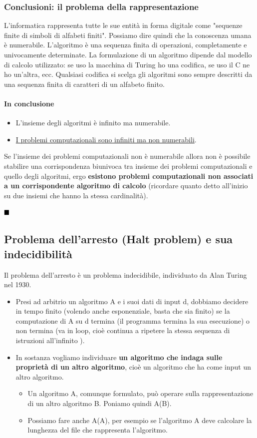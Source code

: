 \subsubsection{Conclusioni: il problema della rappresentazione}
L'informatica rappresenta tutte le sue entità in forma digitale come "sequenze finite di simboli di alfabeti finiti". Possiamo dire quindi che la conoscenza umana è numerabile. L'algoritmo è una sequenza finita di operazioni, completamente e univocamente determinate. La formulazione di un algoritmo dipende dal modello di calcolo utilizzato: se uso la macchina di Turing ho una codifica, se uso il C ne ho un'altra, ecc. Qualsiasi codifica si scelga gli algoritmi sono sempre descritti da una sequenza finita di caratteri di un alfabeto finito. 

\paragraph{In conclusione}
\begin{itemize}
	\item L'insieme degli algoritmi è infinito ma numerabile.
	\item \underline{I problemi computazionali sono infiniti ma non numerabili}.
\end{itemize}
Se l'insieme dei problemi computazionali non è numerabile allora non è possibile stabilire una corrispondenza biunivoca tra insieme dei problemi computazionali e quello degli algoritmi, ergo \textbf{esistono problemi computazionali non associati a un corrispondente algoritmo di calcolo} (ricordare quanto detto all'inizio su due insiemi che hanno la stessa cardinalità).

$\hfill\blacksquare$

\subsection{Problema dell'arresto (Halt problem) e sua indecidibilità}
Il problema dell’arresto è un problema indecidibile, individuato da Alan Turing nel 1930. 
\begin{itemize}
	\item Presi ad arbitrio un algoritmo A e i suoi dati di input d, dobbiamo decidere in tempo finito (volendo anche esponenziale, basta che sia finito) se la computazione di A su d termina (il programma termina la sua esecuzione) o non termina (va in loop, cioè continua a ripetere la stessa sequenza di istruzioni all’infinito ).
	\item In sostanza vogliamo individuare \textbf{un algoritmo che indaga sulle proprietà di un altro algoritmo}, cioè un algoritmo che ha come input un altro algoritmo. 
	\begin{itemize}
		\item Un algoritmo A, comunque formulato, può operare sulla rappresentazione di un altro algoritmo B. Poniamo quindi A(B).
		\item Possiamo fare anche A(A), per esempio se l’algoritmo A deve calcolare la lunghezza del file che rappresenta l’algoritmo.
	\end{itemize}
\end{itemize}
